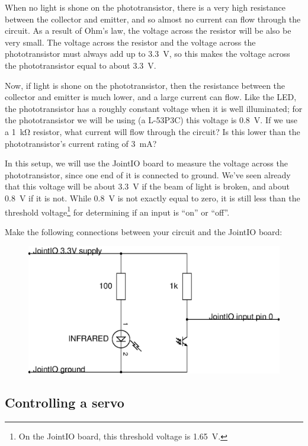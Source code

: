 \documentclass{article}
\begin{document}
When no light is shone on the phototransistor, there is a very high resistance
between the collector and emitter, and so almost no current can flow through
the circuit. As a result of Ohm's law, the voltage across the resistor will be
also be very small. The voltage across the resistor and the voltage across the
phototransistor must always add up to \SI{3.3}{\volt}, so this makes the
voltage across the phototransistor equal to about \SI{3.3}{\volt}.

Now, if light is shone on the phototransistor, then the resistance between the
collector and emitter is much lower, and a large current can flow. Like the LED,
the phototransistor has a roughly constant voltage when it is well illuminated;
for the phototransistor we will be using (a L-53P3C) this voltage is
\SI{0.8}{\volt}. If we use a \SI{1}{\kilo\ohm} resistor, what current will flow
through the circuit? Is this lower than the phototransistor's current rating of
\SI{3}{\milli\ampere}?

In this setup, we will use the JointIO board to measure the voltage across the
phototransistor, since one end of it is connected to ground. We've seen already
that this voltage will be about \SI{3.3}{\volt} if the beam of light is broken,
and about \SI{0.8}{\volt} if it is not. While \SI{0.8}{\volt} is not exactly
equal to zero, it is still less than the threshold voltage\footnote{On the
JointIO board, this threshold voltage is \SI{1.65}{\volt}.} for determining
if an input is ``on'' or ``off''.

Make the following connections between your circuit and the JointIO board:

\begin{figure}[h]
\centering
\includegraphics[width=.5\textwidth]{assets/fig/schem/ir-jointio}
\label{fig:schem:ir-jointio}
\end{figure}

\subsection{Controlling a servo}

\end{document}

